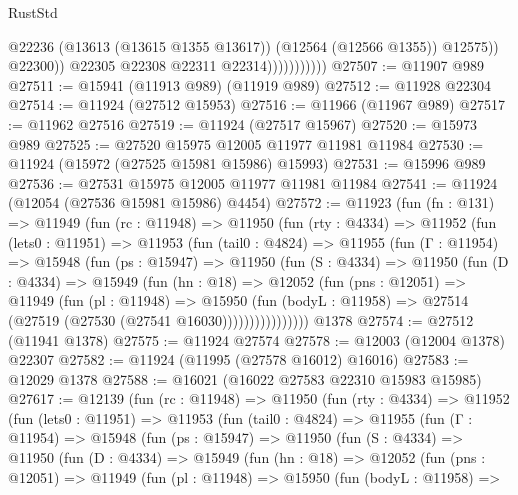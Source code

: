 \begin{lexlean}{RustStd}
\begin{coremodule}
                                  @22236
                                  (@13613 (@13615 @1355 @13617))
                                  (@12564 (@12566 @1355))
                                  @12575))
                              @22300))
                          @22305
                          @22308
                          @22311
                          @22314)))))))))))
@27507 := @11907 @989
@27511 := @15941 (@11913 @989) (@11919 @989)
@27512 := @11928 @22304
@27514 := @11924 (@27512 @15953)
@27516 := @11966 (@11967 @989)
@27517 := @11962 @27516
@27519 := @11924 (@27517 @15967)
@27520 := @15973 @989
@27525 := @27520 @15975 @12005 @11977 @11981 @11984
@27530 := @11924 (@15972 (@27525 @15981 @15986) @15993)
@27531 := @15996 @989
@27536 := @27531 @15975 @12005 @11977 @11981 @11984
@27541 := @11924 (@12054 (@27536 @15981 @15986) @4454)
@27572 := @11923
    (fun (fn : @131) =>
    @11949
      (fun (rc : @11948) =>
      @11950
        (fun (rty : @4334) =>
        @11952
          (fun (lets0 : @11951) =>
          @11953
            (fun (tail0 : @4824) =>
            @11955
              (fun (Γ : @11954) =>
              @15948
                (fun (ps : @15947) =>
                @11950
                  (fun (S : @4334) =>
                  @11950
                    (fun (D : @4334) =>
                    @15949
                      (fun (hn : @18) =>
                      @12052
                        (fun (pns : @12051) =>
                        @11949
                          (fun (pl : @11948) =>
                          @15950
                            (fun (bodyL : @11958) =>
                            @27514 (@27519 (@27530 (@27541 @16030))))))))))))))))
    @1378
@27574 := @27512 (@11941 @1378)
@27575 := @11924 @27574
@27578 := @12003 (@12004 @1378) @22307
@27582 := @11924 (@11995 (@27578 @16012) @16016)
@27583 := @12029 @1378
@27588 := @16021 (@16022 @27583 @22310 @15983 @15985)
@27617 := @12139
    (fun (rc : @11948) =>
    @11950
      (fun (rty : @4334) =>
      @11952
        (fun (lets0 : @11951) =>
        @11953
          (fun (tail0 : @4824) =>
          @11955
            (fun (Γ : @11954) =>
            @15948
              (fun (ps : @15947) =>
              @11950
                (fun (S : @4334) =>
                @11950
                  (fun (D : @4334) =>
                  @15949
                    (fun (hn : @18) =>
                    @12052
                      (fun (pns : @12051) =>
                      @11949
                        (fun (pl : @11948) =>
                        @15950
                          (fun (bodyL : @11958) =>

\end{coremodule}
\end{lexlean}
